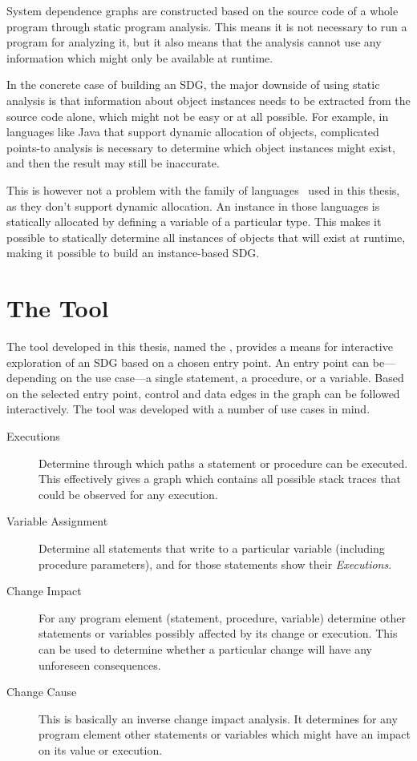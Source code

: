 System dependence graphs are constructed based on the source code of a whole program through static program analysis. 
This means it is not necessary to run a program for analyzing it, but it also means that the analysis cannot use any 
information which might only be available at runtime.

In the concrete case of building an SDG, the major downside of using static analysis is that information about object 
instances needs to be extracted from the source code alone, which might not be easy or at all possible. For example, in 
languages like Java that support dynamic allocation of objects, complicated points-to analysis is necessary to 
determine which object instances might exist, and then the result may still be inaccurate.

This is however not a problem with the \IEC family of languages~\cite{IEC61131:2003} used in this thesis, as they don't 
support dynamic allocation. An instance in those languages is statically allocated by defining a variable of a 
particular type. This makes it possible to statically determine all instances of objects that will exist at runtime, 
making it possible to build an instance-based SDG.


\section{The Tool} \label{sec:intro-tool}

The tool developed in this thesis, named the \emph{\SB}, provides a means for interactive exploration of an SDG based 
on a chosen entry point. An entry point can be---depending on the use case---a single statement, a procedure, or a 
variable. Based on the selected entry point, control and data edges in the graph can be followed interactively. The 
tool was developed with a number of use cases in mind.

\begin{description}
  \item[Executions] Determine through which paths a statement or procedure can be executed. This effectively gives a 
  graph which contains all possible stack traces that could be observed for any execution.
  
  \item[Variable Assignment] Determine all statements that write to a particular variable (including procedure 
  parameters), and for those statements show their \emph{Executions}.
  
  \item[Change Impact] For any program element (statement, procedure, variable) determine other statements or variables 
  possibly affected by its change or execution. This can be used to determine whether a particular change will have any 
  unforeseen consequences.
  
  \item[Change Cause] This is basically an inverse change impact analysis. It determines for any program element
  other statements or variables which might have an impact on its value or execution.
\end{description}

